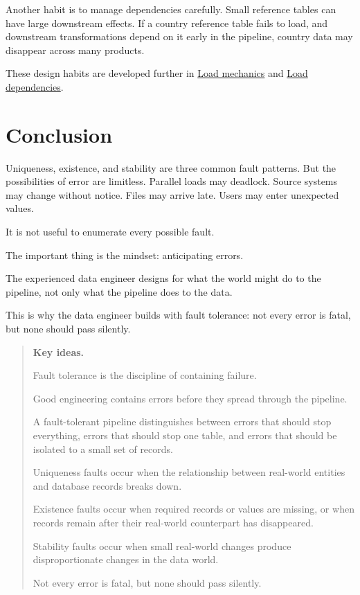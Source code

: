 \documentclass[10pt,openany,10pt]{book}
\newcounter{none}
\begin{document}
Another habit is to manage dependencies carefully. Small reference
tables can have large downstream effects. If a country reference table
fails to load, and downstream transformations depend on it early in the
pipeline, country data may disappear across many products.

These design habits are developed further in
\hyperref[docs-efficient-stable-pipeline-load-mechanics]{Load mechanics}
and \hyperref[docs-efficient-stable-pipeline-load-dependencies]{Load
dependencies}.

\section{Conclusion}\label{conclusion-3}

Uniqueness, existence, and stability are three common fault patterns.
But the possibilities of error are limitless. Parallel loads may
deadlock. Source systems may change without notice. Files may arrive
late. Users may enter unexpected values.

It is not useful to enumerate every possible fault.

The important thing is the mindset: anticipating errors.

The experienced data engineer designs for what the world might do to the
pipeline, not only what the pipeline does to the data.

This is why the data engineer builds with fault tolerance: not every
error is fatal, but none should pass silently.

\begin{quote}
\textbf{Key ideas.}

Fault tolerance is the discipline of containing failure.

Good engineering contains errors before they spread through the
pipeline.

A fault-tolerant pipeline distinguishes between errors that should stop
everything, errors that should stop one table, and errors that should be
isolated to a small set of records.

Uniqueness faults occur when the relationship between real-world
entities and database records breaks down.

Existence faults occur when required records or values are missing, or
when records remain after their real-world counterpart has disappeared.

Stability faults occur when small real-world changes produce
disproportionate changes in the data world.

Not every error is fatal, but none should pass silently.
\end{quote}
\end{document}
